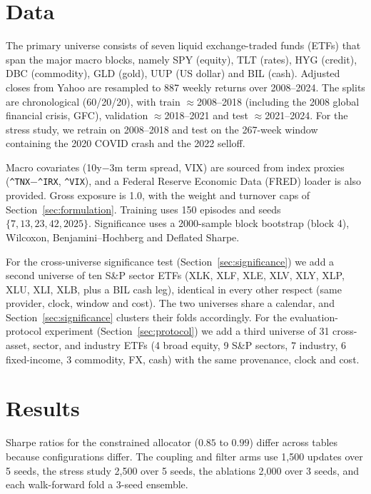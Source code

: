 \documentclass[sigconf]{acmart}
\begin{document}
\section{Data}
\label{sec:data}

The primary universe consists of seven liquid exchange-traded funds (ETFs) that span the major macro blocks, namely SPY (equity), TLT (rates), HYG (credit), DBC (commodity), GLD (gold), UUP
(US dollar) and BIL (cash). Adjusted closes from Yahoo are resampled to 887 weekly returns over
2008--2024. The splits are chronological (60/20/20), with train $\approx$2008--2018 (including the 2008 global financial crisis, GFC), validation $\approx$2018--2021 and test $\approx$2021--2024.
For the stress study, we retrain on 2008--2018 and test on the 267-week window containing the
2020 COVID crash and the 2022 selloff.

Macro covariates (10y$-$3m term spread, VIX) are sourced from index proxies
(\texttt{\^{}TNX$-$\^{}IRX}, \texttt{\^{}VIX}), and a Federal Reserve Economic Data (FRED) loader
is also provided. Gross exposure is 1.0, with the weight and turnover caps of Section~\ref{sec:formulation}. Training uses 150 episodes and seeds $\{7,13,23,42,2025\}$.
Significance uses a 2000-sample block bootstrap (block 4), Wilcoxon, Benjamini--Hochberg and
Deflated Sharpe.

For the cross-universe significance test (Section~\ref{sec:significance}) we add a
second universe of ten S\&P sector ETFs (XLK, XLF, XLE, XLV, XLY, XLP, XLU, XLI, XLB,
plus a BIL cash leg), identical in every other respect (same provider, clock, window
and cost). The two universes share a calendar, and
Section~\ref{sec:significance} clusters their folds accordingly. For the evaluation-protocol
experiment (Section~\ref{sec:protocol}) we add a third universe of 31
cross-asset, sector, and industry ETFs (4 broad equity, 9 S\&P sectors, 7 industry,
6 fixed-income, 3 commodity, FX, cash) with the same provenance, clock and cost.

\section{Results}
\label{sec:results}

Sharpe ratios for the constrained allocator ($0.85$ to $0.99$) differ across tables because configurations differ. The coupling and filter arms use 1,500 updates over 5 seeds, the stress study 2,500 over 5 seeds, the ablations 2,000 over 3 seeds, and each walk-forward fold a 3-seed ensemble.
\end{document}
